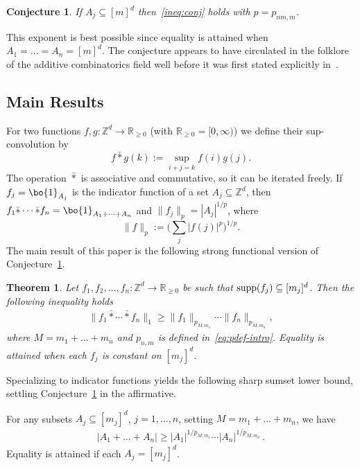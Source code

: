 \documentclass[a4paper,reqno,12pt]{amsart}
\newtheorem{theorem}{Theorem}
\newtheorem{conjecture}{Conjecture}
\newcommand{\z}{\mathbb{Z}}
\renewcommand{\r}{\mathbb{R}}
\newcommand{\1}{\bo{1}}
\begin{document}
	\begin{conjecture}\label{conj:sets}
	If $A_j\subseteq [m]^d$ then~\eqref{ineq:conj} holds with $p=p_{nm,m}$.
	\end{conjecture}
This exponent is best possible since equality is attained when $A_1=\dots=A_n=[m]^d$.
The conjecture appears to have circulated in the folklore of the additive combinatorics field well before it was first stated explicitly in~\cite{Be-Iv-Kr-Ma}.

\subsection{Main Results} For two functions $f,g:\z^d\to\r_{\ge0}$ (with $\r_{\ge0}=[0,\infty)$) we
define their {sup-convolution} by
	\[f\bar{*}g(k) := \sup_{i+j=k} f(i)g(j).\]
The operation $\bar{*}$ is associative and commutative, so it can be iterated freely. If $f_j=\1_{A_j}$ is the indicator function of a set $A_j\subseteq\z^d$, then $f_1\bar{*}\cdots\bar{*}f_n=\1_{A_1+\dots+A_n}$ and $\|f_j\|_p=|A_j|^{1/p}$, where
	\[\|f\|_p:=\Big(\sum_{j}|f(j)|^p\Big)^{1/p}.\]
The main result of this paper is the following strong functional version of Conjecture~\ref{conj:sets}. 

\begin{theorem}\label{thm:main}
Let $f_1,f_2,\ldots,f_n:\z^d \to \r_{\ge0}$ be such that ${\rm supp}(f_j)\subseteq [m_j]^d$. Then the following inequality holds
    \begin{align}\label{ineq:main2}
    \|f_1\bar{*}\cdots \bar{*}f_n\|_1
    \geq \|f_1\|_{p_{M,m_1}} \cdots \|f_n\|_{p_{M,m_n}},
    \end{align}
    where $M=m_1+\dots+m_n$ and $p_{n,m}$ is defined in~\eqref{eq:pdef-intro}. Equality is attained when each $f_j$ is constant on $[m_j]^d$.
\end{theorem}

Specializing to indicator functions yields the following sharp sumset lower bound, settling
Conjecture~\ref{conj:sets} in the affirmative.

\begin{corollary}\label{thm:main1}
For any subsets $A_j \subseteq [m_j]^d$, $j=1,\dots,n$, setting $M=m_1+\dots+m_n$, we have
    \begin{align}\label{ineq:main}
    |A_1+\dots+A_n|\geq |A_1|^{1/p_{M,m_1}}\cdots|A_n|^{1/p_{M,m_n}}\,.
    \end{align}
Equality is attained if each $A_j=[m_j]^d$.
    \end{corollary}
    
\end{document}

